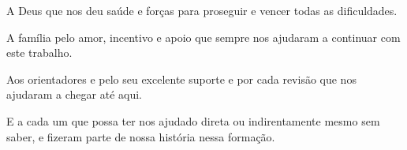 \begin{agradecimentos}

A Deus que nos deu saúde e forças para proseguir e vencer todas as dificuldades.

A família pelo amor, incentivo e apoio que sempre nos ajudaram a continuar com este trabalho.

Aos orientadores {\imprimirorientador} e {\imprimircoorientador} pelo seu excelente suporte e por cada revisão que nos ajudaram a chegar até aqui.

E a cada um que possa ter nos ajudado direta ou indirentamente mesmo sem saber, e fizeram parte de nossa história nessa formação.

\end{agradecimentos}
